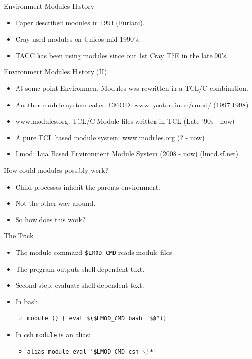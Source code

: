 \documentclass{beamer}
\begin{document}
\begin{frame}{Environment Modules History}
  \begin{itemize}
    \item Paper described modules in 1991 (Furlani).
    \item Cray used modules on Unicos mid-1990's.
    \item TACC has been using modules since our 1st Cray T3E in the
      late 90's.
  \end{itemize}
\end{frame}

\begin{frame}{Environment Modules History (II)}
  \begin{itemize}
    \item At some point Environment Modules was rewritten in a TCL/C combination.
    \item Another module system called CMOD:
      www.lysator.liu.se/cmod/ (1997-1998)
    \item www.modules.org: TCL/C Module files written in TCL (Late '90s - now)
    \item A pure TCL based module system: www.modules.org (? - now)
    \item Lmod: Lua Based Environment Module System (2008 - now) (lmod.sf.net)
  \end{itemize}
\end{frame}

\begin{frame}{How could modules possibly work?}
  \begin{itemize}
    \item Child processes inherit the parents environment.
    \item Not the other way around.
    \item So how does this work?
  \end{itemize}
\end{frame}

\begin{frame}{The Trick}
  \begin{itemize}
    \item The module command {\color{blue}\texttt{\$LMOD\_CMD}} reads module files
    \item The program outputs shell dependent text.
    \item Second step: evaluate shell dependent text.
    \item In bash:
      \begin{itemize}
          \item {\color{blue}\texttt{module () \{ eval \$(\$LMOD\_CMD bash "\$@")\}}}
      \end{itemize}
    \item In csh \texttt{module} is an alias:
      \begin{itemize}
        \item {\color{blue}\texttt{alias module eval `\$LMOD\_CMD csh $\backslash$!*`}}
      \end{itemize}
  \end{itemize}
\end{frame}
\end{document}
